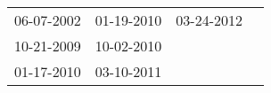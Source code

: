 \begin{supertabular}{llll}
 06-07-2002 &  01-19-2010 &  03-24-2012 \\
 10-21-2009 &  10-02-2010 &             \\
 01-17-2010 &  03-10-2011 &             \\
\end{supertabular}
